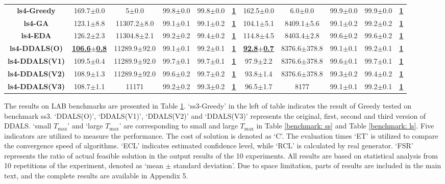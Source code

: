 \documentclass[lettersize,journal]{IEEEtran}
\begin{document}
\begin{table}[!t]
{\begin{tabular}{ccccccccccc}
    \midrule
    {\bfseries ls4-Greedy} &169.7$\pm$0.0&5$\pm$0.0 & 99.8$\pm$0.0&99.8$\pm$0.0 &\underline{\bfseries 1} &162.5$\pm$0.0&6.0$\pm$0.0& 99.9$\pm$0.0&99.9$\pm$0.0  &\underline{\bfseries 1} \\
    {\bfseries ls4-GA} &123.1$\pm$8.8&11307.2$\pm$8.0 & 99.1$\pm$0.1&99.1$\pm$0.2 &\underline{\bfseries 1} &104.1$\pm$5.1&8409.1$\pm$5.6& 99.1$\pm$0.2&99.2$\pm$0.2  &\underline{\bfseries 1} \\
    {\bfseries ls4-EDA} &126.2$\pm$2.3&11304.8$\pm$2.1 & 99.2$\pm$0.2&99.4$\pm$0.2 &\underline{\bfseries 1} &114.8$\pm$4.5& 8403.4$\pm$2.8&99.6$\pm$0.2&99.6$\pm$0.2  &\underline{\bfseries 1} \\
    {\bfseries ls4-DDALS(O)} &\underline{\bfseries 106.6$\pm$0.8} &11289.9$\pm$92.0 & 99.1$\pm$0.1&99.2$\pm$0.1 &\underline{\bfseries 1} &\underline{\bfseries 92.8$\pm$0.7} &8376.6$\pm$378.8& 99.1$\pm$0.1&99.2$\pm$0.1  &\underline{\bfseries 1} \\
    {\bfseries ls4-DDALS(V1)} &109.5$\pm$0.4&11289.9$\pm$92.0 & 99.7$\pm$0.1&99.7$\pm$0.1 &\underline{\bfseries 1} &97.9$\pm$2.2&8376.6$\pm$378.8& 99.6$\pm$0.1&99.7$\pm$0.1  &\underline{\bfseries 1} \\
    {\bfseries ls4-DDALS(V2)} &108.9$\pm$1.3&11289.9$\pm$92.0 & 99.6$\pm$0.2&99.7$\pm$0.2 &\underline{\bfseries 1} &93.8$\pm$1.4&8376.6$\pm$378.8& 99.3$\pm$0.2&99.4$\pm$0.2  &\underline{\bfseries 1} \\
    {\bfseries ls4-DDALS(V3)} &108.7$\pm$1.1&11171 & 99.2$\pm$0.2&99.3$\pm$0.2 &\underline{\bfseries 1} &96.5$\pm$1.7&8177& 99.1$\pm$0.1& 99.2$\pm$0.1  &\underline{\bfseries 1} \\
    
    \bottomrule
    \end{tabular}
    }
\label{result:LAB}
\end{table}

The results on LAB benchmarks are presented in Table \ref{result:LAB}. 
`ss3-Greedy' in the left of table indicates the result of Greedy tested on benchmark ss3. 
`DDALS(O)', `DDALS(V1)', `DDALS(V2)' and `DDALS(V3)' represents the original, first, second and third version of DDALS. 
`small $T_{\max}$' and `large $T_{\max}$' are corresponding to small and large $T_{\max}$ in Table \ref{benchmark: ss} and Table \ref{benchmark: ls}.
Five indicators are utilized to measure the performance. 
The cost of solution is denoted as `C'. 
The evaluation times `ET' is utilized to compare the convergence speed of algorithms. 
`ECL' indicates estimated confidence level, while `RCL' is calculated by real generator. 
`FSR'  represents the ratio of actual feasible solution in the output results of the 10 experiments. 
All results are based on statistical analysis from 10 repetitions of the experiment, denoted as `mean $\pm$ standard deviation'.
Due to space limitation, parts of results are included in the main text, and the complete results are available in Appendix 5.
\end{document}
